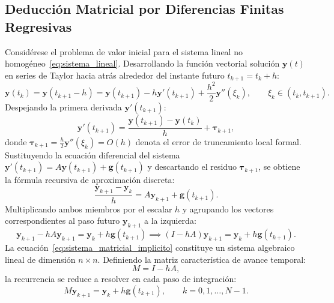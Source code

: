 \documentclass[11pt,a4paper]{article}
\begin{document}
\subsection{Deducción Matricial por Diferencias Finitas Regresivas}
Considérese el problema de valor inicial para el sistema lineal no homogéneo~\eqref{eq:sistema_lineal}. Desarrollando la función vectorial solución $\mathbf{y}(t)$ en series de Taylor hacia atrás alrededor del instante futuro $t_{k+1} = t_k + h$:
\begin{equation}
    \mathbf{y}(t_k) = \mathbf{y}(t_{k+1} - h) = \mathbf{y}(t_{k+1}) - h\mathbf{y}'(t_{k+1}) + \frac{h^2}{2}\mathbf{y}''(\xi_k), \qquad \xi_k \in (t_k, t_{k+1}).
    \label{eq:taylor_backward}
\end{equation}
Despejando la primera derivada $\mathbf{y}'(t_{k+1})$:
\begin{equation}
    \mathbf{y}'(t_{k+1}) = \frac{\mathbf{y}(t_{k+1}) - \mathbf{y}(t_k)}{h} + \boldsymbol{\tau}_{k+1},
\end{equation}
donde $\boldsymbol{\tau}_{k+1} = \frac{h}{2}\mathbf{y}''(\xi_k) = O(h)$ denota el error de truncamiento local formal. Sustituyendo la ecuación diferencial del sistema $\mathbf{y}'(t_{k+1}) = A\mathbf{y}(t_{k+1}) + \mathbf{g}(t_{k+1})$ y descartando el residuo $\boldsymbol{\tau}_{k+1}$, se obtiene la fórmula recursiva de aproximación discreta:
\begin{equation}
    \frac{\mathbf{y}_{k+1} - \mathbf{y}_k}{h} = A\mathbf{y}_{k+1} + \mathbf{g}(t_{k+1}).
\end{equation}
Multiplicando ambos miembros por el escalar $h$ y agrupando los vectores correspondientes al paso futuro $\mathbf{y}_{k+1}$ a la izquierda:
\begin{equation}
    \mathbf{y}_{k+1} - h A\mathbf{y}_{k+1} = \mathbf{y}_k + h\mathbf{g}(t_{k+1}) \implies (I - hA)\mathbf{y}_{k+1} = \mathbf{y}_k + h\mathbf{g}(t_{k+1}).
    \label{eq:sistema_matricial_implicito}
\end{equation}
La ecuación~\eqref{eq:sistema_matricial_implicito} constituye un sistema algebraico lineal de dimensión $n \times n$. Definiendo la matriz característica de avance temporal:
\begin{equation}
    M = I - hA,
    \label{eq:matriz_avance_M}
\end{equation}
la recurrencia se reduce a resolver en cada paso de integración:
\begin{equation}
    M \mathbf{y}_{k+1} = \mathbf{y}_k + h\mathbf{g}(t_{k+1}), \qquad k = 0, 1, \dots, N-1.
\end{equation}
\end{document}
